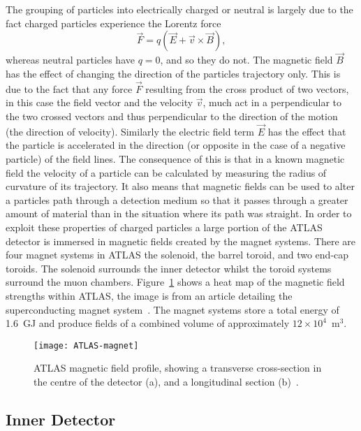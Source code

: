 The grouping of particles into electrically charged or neutral is largely due to
the fact charged particles experience the Lorentz force
\begin{equation}
  \label{eq:lorentz}
  \vec{F} = q(\vec{E} + \vec{v} \times \vec{B}),
\end{equation}
whereas neutral particles have $q=0$, and so they do not. The magnetic field
$\vec{B}$ has the effect of changing the direction of the particles trajectory
only. This is due to the fact that any force $\vec{F}$ resulting from the cross
product of two vectors, in this case the field vector and the velocity $\vec{v}$,
much act in a perpendicular to the two crossed vectors and thus perpendicular to
the direction of the motion (the direction of velocity). Similarly the electric
field term $\vec{E}$ has the effect that the particle is accelerated in the
direction (or opposite in the case of a negative particle) of the field lines.
The consequence of this is that in a known magnetic field the velocity of a
particle can be calculated by measuring the radius of curvature of its
trajectory. It also means that magnetic fields can be used to alter a particles
path through a detection medium so that it passes through a greater amount of
material than in the situation where its path was straight. In order to exploit
these properties of charged particles a large portion of the ATLAS detector is
immersed in magnetic fields created by the magnet systems. There are four magnet
systems in ATLAS the solenoid, the barrel toroid, and two end-cap toroids. The
solenoid surrounds the inner detector whilst the toroid systems surround the
muon chambers. Figure~\ref{fig:ATLAS-magnets} shows a heat map of the magnetic
field strengths within ATLAS, the image is from an article detailing the
superconducting magnet system~\cite{ATLAS-magnets}. The magnet systems store a
total energy of 1.6~GJ and produce fields of a combined volume of approximately
$12\times 10^4$~m$^3$.
\begin{figure}[h]
  \centering
  \texttt{[image: ATLAS-magnet]}
  \caption{ATLAS magnetic field profile, showing a transverse cross-section in
    the centre of the detector (a), and a longitudinal section
    (b)~\cite{ATLAS-magnets}.}%
  \label{fig:ATLAS-magnets}
\end{figure}

\subsection{Inner Detector}%
\label{sec:id}

